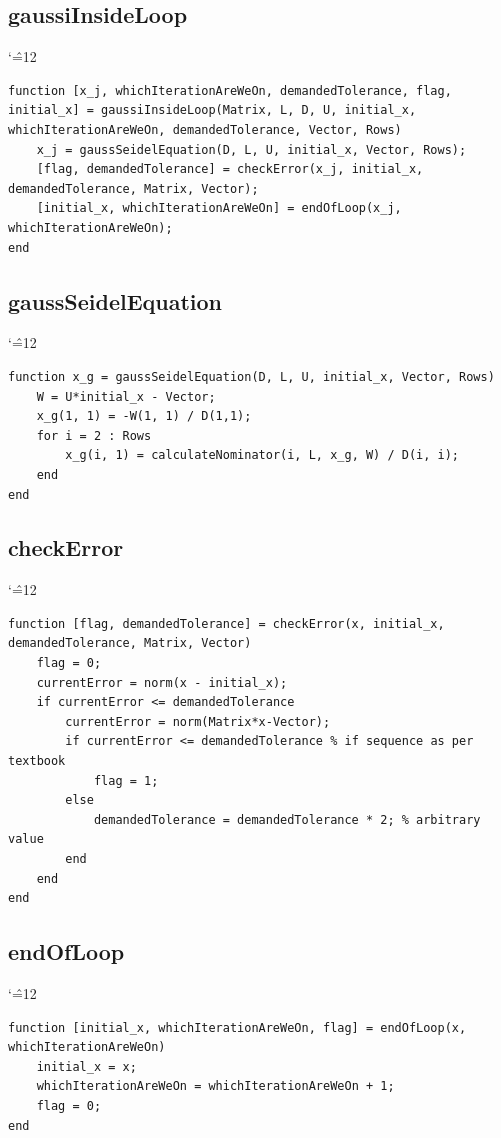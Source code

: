 \documentclass[12pt]{report}
\newenvironment{simplechar}{%
   \catcode`\^=12
}{}
\begin{document}
\subsection{gaussiInsideLoop}
\begin{simplechar}
\begin{lstlisting}
function [x_j, whichIterationAreWeOn, demandedTolerance, flag, initial_x] = gaussiInsideLoop(Matrix, L, D, U, initial_x, whichIterationAreWeOn, demandedTolerance, Vector, Rows)
    x_j = gaussSeidelEquation(D, L, U, initial_x, Vector, Rows);
    [flag, demandedTolerance] = checkError(x_j, initial_x, demandedTolerance, Matrix, Vector);
    [initial_x, whichIterationAreWeOn] = endOfLoop(x_j, whichIterationAreWeOn);
end
\end{lstlisting}
\end{simplechar}

\subsection{gaussSeidelEquation}
\begin{simplechar}
\begin{lstlisting}
function x_g = gaussSeidelEquation(D, L, U, initial_x, Vector, Rows)
    W = U*initial_x - Vector;
    x_g(1, 1) = -W(1, 1) / D(1,1);
    for i = 2 : Rows
        x_g(i, 1) = calculateNominator(i, L, x_g, W) / D(i, i);
    end
end
\end{lstlisting}
\end{simplechar}

\subsection{checkError}
\begin{simplechar}
\begin{lstlisting}
function [flag, demandedTolerance] = checkError(x, initial_x, demandedTolerance, Matrix, Vector)
    flag = 0;
    currentError = norm(x - initial_x);
    if currentError <= demandedTolerance
        currentError = norm(Matrix*x-Vector);
        if currentError <= demandedTolerance % if sequence as per textbook
            flag = 1;
        else
            demandedTolerance = demandedTolerance * 2; % arbitrary value
        end
    end
end
\end{lstlisting}
\end{simplechar}

\subsection{endOfLoop}
\begin{simplechar}
\begin{lstlisting}
function [initial_x, whichIterationAreWeOn, flag] = endOfLoop(x, whichIterationAreWeOn)
    initial_x = x;
    whichIterationAreWeOn = whichIterationAreWeOn + 1;
    flag = 0;
end
\end{lstlisting}
\end{simplechar}
\end{document}
